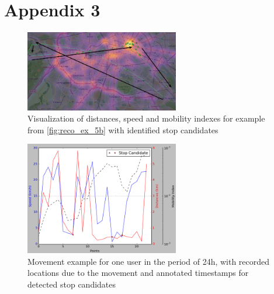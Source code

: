 \chapter{Appendix 3}
\label{appendix:add_example_3}

\begin{figure}[!ht]
	\centering
	\includegraphics[width=0.6\textwidth]{images/reco_example_5a.png}
	\caption{ Visualization of distances, speed and mobility indexes for example from \autoref{fig:reco_ex_5b} with identified stop candidates }
	\label{fig:reco_ex_5a}
\end{figure} 

\begin{figure}[!ht]
	\centering
	\includegraphics[width=0.6\textwidth]{images/reco_example_5b.png}
	\caption{ Movement example for one user in the period of 24h, with recorded locations due to the movement and annotated timestamps for detected stop candidates }
	\label{fig:reco_ex_5b}
\end{figure}